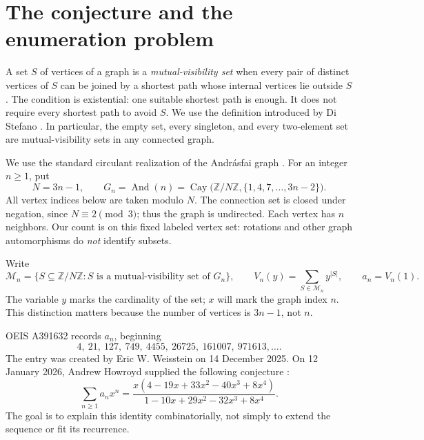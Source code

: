 \documentclass[11pt,a4paper]{article}
\theoremstyle{definition}
\newcommand{\Z}{\mathbb Z}
\newcommand{\MV}{\mathcal M}
\newcommand{\Andr}{\operatorname{And}}
\begin{document}
\clearpage
\tableofcontents
\clearpage

\section{The conjecture and the enumeration problem}
\label{sec:problem}

A set $S$ of vertices of a graph is a \emph{mutual-visibility set} when every
pair of distinct vertices of $S$ can be joined by a shortest path whose
internal vertices lie outside $S$. The condition is existential: one suitable
shortest path is enough. It does not require every shortest path to avoid
$S$. We use the definition introduced by Di Stefano \cite{distefano}.
In particular, the empty set, every singleton, and every two-element set
are mutual-visibility sets in any connected graph.

We use the standard circulant realization of the Andr\'asfai graph
\cite{metric}. For an integer $n\ge1$, put
\begin{equation}
 N=3n-1,\qquad
 G_n=\Andr(n)=\operatorname{Cay}\bigl(\Z/N\Z,\{1,4,7,\ldots,3n-2\}\bigr).
 \label{eq:graph}
\end{equation}
All vertex indices below are taken modulo $N$. The connection set is closed
under negation, since $N\equiv2\pmod3$; thus the graph is undirected. Each
vertex has $n$ neighbors. Our count is on this fixed labeled vertex set:
rotations and other graph automorphisms do \emph{not} identify subsets.

Write
\begin{equation}
 \MV_n=\{S\subseteq\Z/N\Z:S\text{ is a mutual-visibility set of }G_n\},
 \qquad
 V_n(y)=\sum_{S\in\MV_n}y^{|S|},\qquad a_n=V_n(1).
 \label{eq:enumerator}
\end{equation}
The variable $y$ marks the cardinality of the set; $x$ will mark the graph
index $n$. This distinction matters because the number of vertices is
$3n-1$, not $n$.

OEIS A391632 records $a_n$, beginning
\[
4,\ 21,\ 127,\ 749,\ 4455,\ 26725,\ 161007,\ 971613,\ldots.
\]
The entry was created by Eric W. Weisstein on 14 December 2025. On
12 January 2026, Andrew Howroyd supplied the following conjecture
\cite{oeis}:
\begin{equation}
 \sum_{n\ge1}a_nx^n=
 \frac{x(4-19x+33x^2-40x^3+8x^4)}
 {1-10x+29x^2-32x^3+8x^4}.
 \label{eq:conjecture}
\end{equation}
The goal is to explain this identity combinatorially, not simply to extend
the sequence or fit its recurrence.
\end{document}
